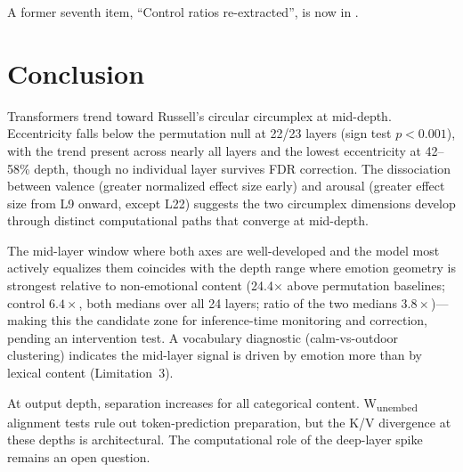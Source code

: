 \documentclass[11pt,a4paper]{article}
\begin{document}
\noindent A former seventh item, ``Control ratios re-extracted'', is now in
.

\section{Conclusion}
\label{sec:conclusion}

Transformers trend toward Russell's circular circumplex at mid-depth.
Eccentricity falls below the permutation null at 22/23 layers (sign test
$p < 0.001$), with the trend present across nearly all layers and the
lowest eccentricity at 42--58\% depth, though no individual layer
survives FDR correction. The dissociation
between valence (greater normalized effect size early) and arousal
(greater effect size from L9 onward, except L22) suggests the two circumplex dimensions
develop through distinct computational paths that converge at mid-depth.

The mid-layer window where both axes are well-developed and the model
most actively equalizes them coincides with the depth range where emotion
geometry is strongest relative to non-emotional content (24.4$\times$
above permutation baselines; control $6.4\times$, both medians over all 24 layers;
ratio of the two medians $3.8\times$)---making this the candidate zone for inference-time
monitoring and correction, pending an intervention test. A vocabulary diagnostic (calm-vs-outdoor
clustering) indicates the mid-layer signal is driven by emotion more
than by lexical content (Limitation~3).

At output depth, separation increases for all categorical content.
W\textsubscript{unembed} alignment tests rule out token-prediction
preparation, but the K/V divergence at these depths is architectural.
The computational role of the deep-layer spike remains an open question.
\end{document}

